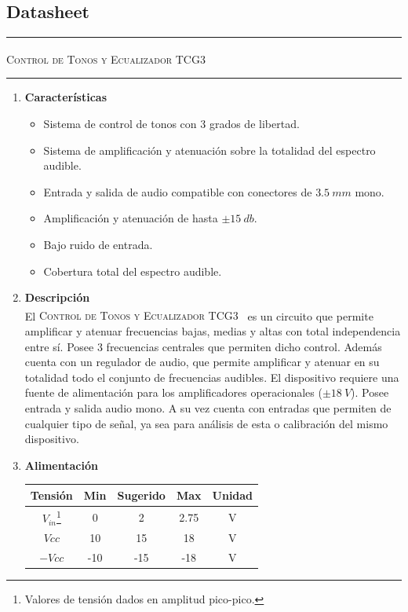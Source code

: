 



\subsection{Datasheet}

\begin{center}
\rule{\textwidth}{1pt}
\textsc{Control de Tonos y Ecualizador TCG3 \textsuperscript{\textregistered}}
\rule{\textwidth}{1pt}
\end{center}

\begin{multicols}{2}

\begin{enumerate}
	\item[1] \textbf{Características}
	\begin{itemize}
		\item Sistema de control de tonos con 3 grados de libertad.
		\item Sistema de amplificación y atenuación sobre la totalidad del espectro audible.
		\item Entrada y salida de audio compatible con conectores de $3.5 \ mm$ mono.
		\item Amplificación y atenuación de hasta $\pm 15 \ db$.
		\item Bajo ruido de entrada.
		\item Cobertura total del espectro audible.
	\end{itemize}
	
	\item[2] \textbf{Descripción}\\
		El \textsc{Control de Tonos y Ecualizador TCG3~\textsuperscript{\textregistered}} es un circuito que permite amplificar y atenuar frecuencias bajas, medias y altas con total independencia entre sí. Posee 3 frecuencias centrales que permiten dicho control. Además cuenta con un regulador de audio, que permite amplificar y atenuar en su totalidad todo el conjunto de frecuencias audibles. El dispositivo requiere una fuente de alimentación para los amplificadores operacionales ($\pm 18 \ V$). Posee entrada y salida audio mono. A su vez cuenta con entradas que permiten de cualquier tipo de señal, ya sea para análisis de esta o calibración del mismo dispositivo.
	
	\item[3] \textbf{Alimentación}
	\begin{table}[H]
		\begin{tabular}{ccccc}
			\hline	
			Tensión & Min & Sugerido & Max & Unidad \\
			\hline
			$V_{in}$\footnote{Valores de tensión dados en amplitud pico-pico.}    & 0 	& 2		   & 2.75	 	& V \\
			$Vcc$       & 10  	& 15       & 18 	& V \\
			$-Vcc$      & -10 	& -15      & -18 	& V	\\
			\hline
		\end{tabular}
	\end{table}
		

\end{enumerate}
\end{multicols}
